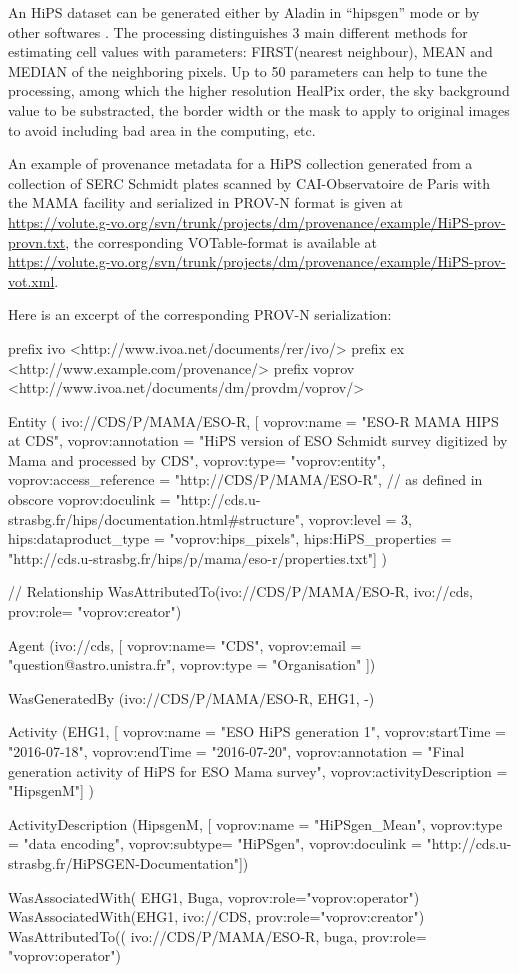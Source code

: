 An HiPS dataset can be generated either by Aladin in ``hipsgen'' mode or by other softwares \cite{if others}.  The processing distinguishes 3 main different methods for estimating cell values with parameters: FIRST(nearest neighbour), MEAN and MEDIAN of the neighboring pixels. Up to 50 parameters can help to tune the processing, among which the higher resolution HealPix order, the sky background value to be substracted, the border width or the mask to apply to original images to avoid including bad area in the computing, etc.


An example of provenance metadata for a HiPS collection generated from a collection of SERC Schmidt plates scanned by CAI-Observatoire de Paris with the MAMA facility and serialized in PROV-N format is given at \\\footnotesize
\footnotesize{\url{https://volute.g-vo.org/svn/trunk/projects/dm/provenance/example/HiPS-prov-provn.txt}}, the corresponding VOTable-format is available at \\
\url{https://volute.g-vo.org/svn/trunk/projects/dm/provenance/example/HiPS-prov-vot.xml}.

Here is an excerpt of the corresponding PROV-N serialization:

\begin{verbnobox}[\scriptsize]
prefix ivo <http://www.ivoa.net/documents/rer/ivo/>
prefix ex <http://www.example.com/provenance/>
prefix voprov <http://www.ivoa.net/documents/dm/provdm/voprov/>

Entity
( ivo://CDS/P/MAMA/ESO-R, 
[ voprov:name = "ESO-R MAMA HIPS at CDS",
voprov:annotation = "HiPS version of ESO Schmidt survey digitized by Mama and processed by CDS",
voprov:type= "voprov:entity",
voprov:access_reference = "http://CDS/P/MAMA/ESO-R", // as defined in obscore 
voprov:doculink = "http://cds.u-strasbg.fr/hips/documentation.html#structure",
voprov:level = 3,
hips:dataproduct_type = "voprov:hips_pixels",
hips:HiPS_properties = "http://cds.u-strasbg.fr/hips/p/mama/eso-r/properties.txt"] )

// Relationship
WasAttributedTo(ivo://CDS/P/MAMA/ESO-R, ivo://cds, prov:role= "voprov:creator")

Agent
(ivo://cds,
[ voprov:name= "CDS",
voprov:email = "question@astro.unistra.fr",
voprov:type = "Organisation" ]) 

WasGeneratedBy  (ivo://CDS/P/MAMA/ESO-R, EHG1, -) 

Activity
(EHG1,
[ voprov:name = "ESO HiPS generation 1",
voprov:startTime = "2016-07-18", 
voprov:endTime = "2016-07-20",
voprov:annotation = "Final generation activity of HiPS for ESO Mama survey",
voprov:activityDescription = "HipsgenM"] )
 
ActivityDescription 
(HipsgenM,
[ voprov:name = "HiPSgen_Mean",
voprov:type = "data encoding",
voprov:subtype= "HiPSgen",
voprov:doculink = "http://cds.u-strasbg.fr/HiPSGEN-Documentation"])

WasAssociatedWith( EHG1, Buga, voprov:role="voprov:operator")
WasAssociatedWith(EHG1, ivo://CDS, prov:role="voprov:creator")
WasAttributedTo(( ivo://CDS/P/MAMA/ESO-R, buga, prov:role= "voprov:operator")
\end{verbnobox}
